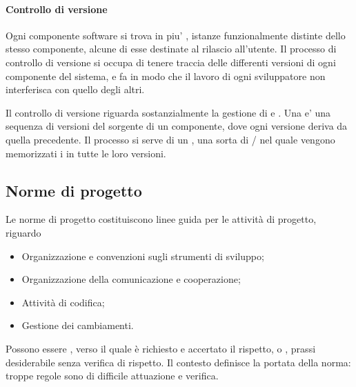\paragraph{Controllo di versione}

Ogni componente software si trova in piu' , istanze
funzionalmente distinte dello stesso componente, alcune di esse destinate al
rilascio all'utente. Il processo di controllo di versione si occupa di tenere
traccia delle differenti versioni di ogni componente del sistema, e fa in modo
che il lavoro di ogni sviluppatore non interferisca con quello degli altri.

Il controllo di versione riguarda sostanzialmente la gestione di
 e . Una  e' una
sequenza di versioni del sorgente di un componente, dove ogni versione deriva da
quella precedente. Il processo si serve di un , una sorta
di / nel quale vengono memorizzati i
 in tutte le loro versioni.

\subsection{Norme di progetto}
\label{sub:norme_di_progetto}

Le norme di progetto costituiscono linee guida per le attività di progetto,
riguardo

\begin{itemize}
  \item Organizzazione e convenzioni sugli strumenti di sviluppo;
  \item Organizzazione della comunicazione e cooperazione;
  \item Attività di codifica;
  \item Gestione dei cambiamenti.
\end{itemize}

Possono essere , verso il quale è richiesto e accertato il
rispetto, o , prassi desiderabile senza verifica di
rispetto. Il contesto definisce la portata della norma: troppe regole sono di
difficile attuazione e verifica.
